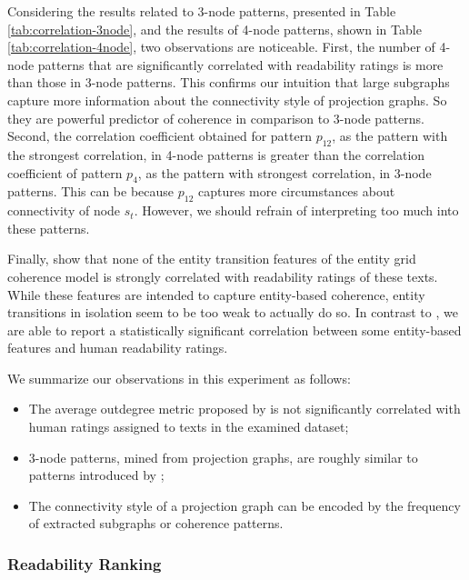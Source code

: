 Considering the results related to 3-node patterns, presented in Table \ref{tab:correlation-3node}, and the results of 4-node patterns, shown in Table \ref{tab:correlation-4node}, two observations are noticeable.
First, the number of 4-node patterns that are significantly correlated with readability ratings is more than those in 3-node patterns. 
This confirms our intuition that large subgraphs capture more information about the connectivity style of projection graphs. 
So they are powerful predictor of coherence in comparison to 3-node patterns.  
Second, the correlation coefficient obtained for pattern $p_{12}$, as the pattern with the strongest correlation, in 4-node patterns is greater than the correlation coefficient of pattern $p_4$, as the pattern with strongest correlation, in 3-node patterns. 
This can be because $p_{12}$ captures more circumstances about connectivity of node $s_t$. 
However, we should refrain of interpreting too much into these patterns. 

Finally,  show that none of the entity transition features of the entity grid coherence model is strongly correlated with readability ratings of these texts. 
While these features are intended to capture entity-based coherence, entity transitions in isolation seem to be too weak to actually do so. 
In contrast to , we are able to report a statistically significant correlation between some entity-based features and human readability ratings.

We summarize our observations in this experiment as follows: 

\begin{itemize}

	\item The average outdegree metric proposed by  is not significantly correlated with human ratings assigned to texts in the examined dataset;

	\item 3-node patterns, mined from projection graphs, are roughly similar to patterns introduced by ;

	\item The connectivity style of a projection graph can be encoded by the frequency of extracted subgraphs or coherence patterns.

\end{itemize}


\subsubsection{Readability Ranking}

